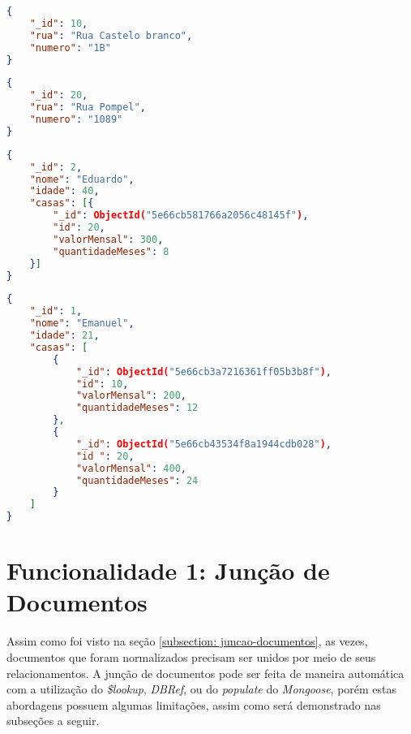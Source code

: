 \begin{lstlisting}[language=json, caption={Documento da Casa de Número 1B\label{lst: doc-casa-1b}}]
{
    "_id": 10,
    "rua": "Rua Castelo branco",
    "numero": "1B"
}
\end{lstlisting}

\newpage

\begin{lstlisting}[language=json, caption={Documento da Casa de Número 1089\label{lst: doc-casa-1089}}]
{
    "_id": 20,
    "rua": "Rua Pompel",
    "numero": "1089"
}
\end{lstlisting}


\begin{lstlisting}[language=json, caption={Documento da Pessoa \textit{Eduardo}\label{lst: doc-pessoa-eduardo}}]
{
    "_id": 2,
    "nome": "Eduardo",
    "idade": 40,
    "casas": [{
        "_id": ObjectId("5e66cb581766a2056c48145f"),
        "id": 20,
        "valorMensal": 300,
        "quantidadeMeses": 8
    }]
}
\end{lstlisting}


\begin{lstlisting}[language=json, caption={Documento da Pessoa \textit{Emanuel}\label{lst: doc-pessoa-emanuel}}]
{
    "_id": 1,
    "nome": "Emanuel",
    "idade": 21,
    "casas": [
        {
            "_id": ObjectId("5e66cb3a7216361ff05b3b8f"),
            "id": 10,
            "valorMensal": 200,
            "quantidadeMeses": 12
        },
        {
            "_id": ObjectId("5e66cb43534f8a1944cdb028"),
            "id ": 20,
            "valorMensal": 400,
            "quantidadeMeses": 24
        }
    ]
}
\end{lstlisting}

\section{Funcionalidade 1: Junção de Documentos\label{section: juncao-documentos}}

Assim como foi visto na seção \ref{subsection: juncao-documentos}, as vezes, documentos que foram normalizados precisam ser unidos por meio de seus relacionamentos. A junção de documentos pode ser feita de maneira automática com a utilização do \textit{\$lookup}, \textit{DBRef}, ou do \textit{populate} do \textit{Mongoose}, porém estas abordagens possuem algumas limitações, assim como será demonstrado nas subseções a seguir.


